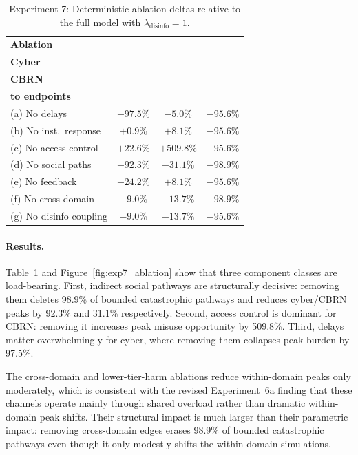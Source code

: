 \documentclass[11pt]{article}
\begin{document}
\begin{table}[t]
\centering
\caption{Experiment 7: Deterministic ablation deltas relative to the full model with $\lambda_{\text{disinfo}} = 1$.}
\label{tab:exp7}
\small
\begin{tabular}{@{}lccc@{}}
\toprule
\textbf{Ablation} & \makecell{\textbf{$\Delta$ Peak}\\\textbf{Cyber}} & \makecell{\textbf{$\Delta$ Peak}\\\textbf{CBRN}} & \makecell{\textbf{$\Delta$ Pathways}\\\textbf{to endpoints}} \\
\midrule
(a) No delays & $-97.5\%$ & $-5.0\%$ & $-95.6\%$ \\
(b) No inst.\ response & $+0.9\%$ & $+8.1\%$ & $-95.6\%$ \\
(c) No access control & $+22.6\%$ & $+509.8\%$ & $-95.6\%$ \\
(d) No social paths & $-92.3\%$ & $-31.1\%$ & $-98.9\%$ \\
(e) No feedback & $-24.2\%$ & $+8.1\%$ & $-95.6\%$ \\
(f) No cross-domain & $-9.0\%$ & $-13.7\%$ & $-98.9\%$ \\
(g) No disinfo coupling & $-9.0\%$ & $-13.7\%$ & $-95.6\%$ \\
\bottomrule
\end{tabular}
\end{table}

\paragraph{Results.} Table~\ref{tab:exp7} and Figure~\ref{fig:exp7_ablation} show that three component classes are load-bearing. First, indirect social pathways are structurally decisive: removing them deletes 98.9\% of bounded catastrophic pathways and reduces cyber/CBRN peaks by 92.3\% and 31.1\% respectively. Second, access control is dominant for CBRN: removing it increases peak misuse opportunity by 509.8\%. Third, delays matter overwhelmingly for cyber, where removing them collapses peak burden by 97.5\%.

The cross-domain and lower-tier-harm ablations reduce within-domain peaks only moderately, which is consistent with the revised Experiment~6a finding that these channels operate mainly through shared overload rather than dramatic within-domain peak shifts. Their structural impact is much larger than their parametric impact: removing cross-domain edges erases 98.9\% of bounded catastrophic pathways even though it only modestly shifts the within-domain simulations.
\end{document}
